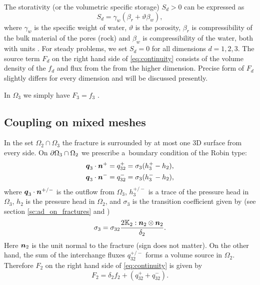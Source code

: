 The storativity (or the volumetric specific storage) $S_d>0$ can be expressed as
\begin{equation}
  S_d = \gamma_w(\beta_r + \vartheta \beta_w),
\end{equation}
where $\gamma_w$  is the specific weight of water, $\vartheta$ \units{}{}{} is the porosity,
$\beta_r$ is compressibility of the bulk material of the pores (rock)
and $\beta_w$ is compressibility of the water, both with units . For steady problems, we set $S_d=0$ for all dimensions $d=1,2,3$.
The source term $F_d$ on the right hand side of \eqref{eq:continuity} consists of the volume density of the 
 $f_d$ and flux from the from the higher dimension. 
Precise form of $F_d$ slightly differs for every dimension and will be discussed presently.

In $\Omega_3$ we simply have $F_3  = f_3$ .

\subsection{Coupling on mixed meshes}
In the set $\Omega_2 \cap \Omega_3$ the fracture is surrounded by at most one 3D surface from every side.
On $\partial\Omega_3 \cap \Omega_2$ we prescribe a~boundary condition of the Robin type:
\begin{align*}
        \mathbf{\boldsymbol{q}}_3\cdot \mathbf{\boldsymbol{n}}^{+} &= q_{32}^{+} =\sigma_{3} (h_3^{+}-h_2),\\
        \mathbf{\boldsymbol{q}}_3\cdot \mathbf{\boldsymbol{n}}^{-} &= q_{32}^{-} =\sigma_{3} (h_3^{-}-h_2),
\end{align*}
where $\mathbf{\boldsymbol{q}}_3\cdot\mathbf{\boldsymbol{n}}^{+/-}$  is the outflow from $\Omega_3$, $h_3^{+/-}$ is
a trace of the pressure head in $\Omega_3$, $h_2$ is the pressure head in $\Omega_2$, and 
$\sigma_{3}$  is the transition coefficient given by (see section \ref{sc:ad_on_fractures} and \cite{martin_modeling_2005})
\[
\label{e:sigma3_law}
  \sigma_3 = \sigma_{32} \frac{2\tn K_2 :\vc n_2\otimes\vc n_2 }{\delta_2}.
\]
Here $\mathbf{\boldsymbol{n}}_2$ is the unit normal to the fracture (sign does not matter).
On the other hand, the sum of the interchange fluxes $q_{32}^{+/-}$ forms
a volume source in $\Omega_2$.  Therefore $F_2$  on the right hand side of \eqref{eq:continuity} is
given by
\begin{equation}
   \label{source_2D}
   F_2 = \delta_2 f_2 + (q_{32}^{+} + q_{32}^{-}).
\end{equation}

